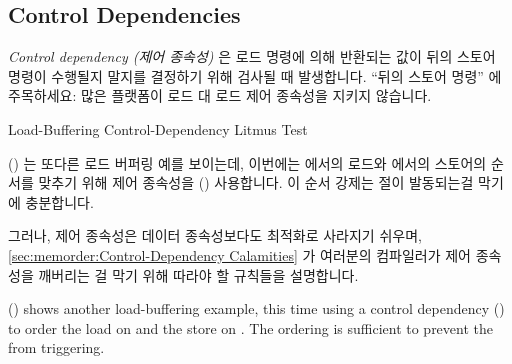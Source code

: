 \fi

\subsection{Control Dependencies}
\label{sec:memorder:Control Dependencies}

\emph{Control dependency (제어 종속성)} 은 로드 명령에 의해 반환되는 값이 뒤의
스토어 명령이 수행될지 말지를 결정하기 위해 검사될 때 발생합니다.
``뒤의 스토어 명령'' 에 주목하세요: 많은 플랫폼이 로드 대 로드 제어 종속성을
지키지 않습니다.

\begin{listing}[tbp]

\caption{Load-Buffering Control-Dependency Litmus Test}
\label{lst:memorder:Load-Buffering Control-Dependency Litmus Test}
\end{listing}

\begin{fcvref}
()
는 또다른 로드 버퍼링 예를 보이는데, 이번에는  에서의 로드와
 에서의 스토어의 순서를 맞추기 위해 제어 종속성을 ()
사용합니다.
이 순서 강제는  절이 발동되는걸 막기에 충분합니다.
\end{fcvref}

그러나, 제어 종속성은 데이터 종속성보다도 최적화로 사라지기 쉬우며,
\cref{sec:memorder:Control-Dependency Calamities}
가 여러분의 컴파일러가 제어 종속성을 깨버리는 걸 막기 위해 따라야 할 규칙들을
설명합니다.

\iffalse

\begin{fcvref}
()
shows another load-buffering example, this time using a control
dependency () to order the load on  and the store on
.
The ordering is sufficient to prevent the  from triggering.
\end{fcvref}

